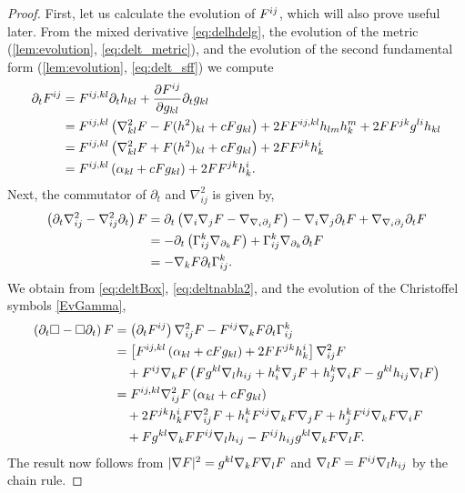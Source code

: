 \documentclass{amsart}
\begin{document}
\begin{proof}
First, let us calculate the evolution of \(F^{ij}\), which will also prove useful later. From the mixed derivative \cref{eq:delhdelg}, the evolution of the metric (\cref{lem:evolution}, \cref{eq:delt_metric}), and the evolution of the second fundamental form (\cref{lem:evolution}, \cref{eq:delt_sff}) we compute
\begin{equation}
\label{eq:deltBox}
\begin{split}
\partial_{t} F^{ij} &= F^{ij,kl} \partial_t h_{kl} + \frac{\partial F^{ij}}{\partial g_{kl}} \partial_t g_{kl} \\
&= F^{ij,kl} \left(\nabla^2_{kl} F - F(h^2)_{kl} + c F g_{kl}\right) + 2F F^{ij,kl} h_{lm}h^{m}_{k} + 2FF^{jk}g^{li}h_{kl} \\
&= F^{ij,kl} \left(\nabla^2_{kl} F + F(h^2)_{kl} + c F g_{kl}\right) + 2FF^{jk}h^{i}_{k} \\
&= F^{ij,kl} \left(\alpha_{kl} + c F g_{kl}\right) + 2FF^{jk}h^{i}_{k}.
\end{split}
\end{equation}
Next, the commutator of \(\partial_t\) and \(\nabla^2_{ij}\) is given by,
\begin{equation}
\label{eq:deltnabla2}
\begin{split}
\left(\partial_{t}\nabla^2_{ij} - \nabla^2_{ij}\partial_{t}\right) F &= \partial_t \left(\nabla_i \nabla_j F - \nabla_{\nabla_i \partial_j} F\right) - \nabla_i \nabla_j \partial_t F + \nabla_{\nabla_i \partial_j} \partial_t F \\
&= - \partial_t \left(\Gamma_{ij}^k \nabla_{\partial_k} F\right) + \Gamma_{ij}^k \nabla_{\partial_k} \partial_t F \\
&= - \nabla_k F \partial_t \Gamma_{ij}^k.
\end{split}
\end{equation}
We obtain from \cref{eq:deltBox}, \cref{eq:deltnabla2}, and the evolution of the Christoffel symbols \cref{EvGamma},
\[
\begin{split}
\left(\partial_{t}\Box - \Box\partial_{t}\right) F &= \left(\partial_{t}F^{ij}\right) \nabla^2_{ij} F - F^{ij}\nabla_k F\partial_t \Gamma^{k}_{ij} \\
&= \left[F^{ij,kl} \left(\alpha_{kl} + c F g_{kl}\right) + 2FF^{jk}h^{i}_{k}\right] \nabla^2_{ij} F \\
&\quad + F^{ij} \nabla_k F \left(F g^{kl} \nabla_l h_{ij} + h^k_i \nabla_j F + h^k_j \nabla_i F - g^{kl} h_{ij} \nabla_l F\right) \\
&= F^{ij,kl} \nabla^2_{ij} F \left(\alpha_{kl} + c F g_{kl}\right) \\
&\quad + 2F^{jk}h^{i}_{k}F \nabla^2_{ij} F + h^k_i F^{ij} \nabla_k F \nabla_j F + h^k_j F^{ij} \nabla_k F \nabla_i F \\
&\quad + F g^{kl}\nabla_k F F^{ij} \nabla_l h_{ij} - F^{ij} h_{ij} g^{kl}\nabla_k F \nabla_l F.
\end{split}
\]
The result now follows from \(|\nabla F|^2 = g^{kl}\nabla_k F \nabla_l F\) and \(\nabla_l F = F^{ij} \nabla_l h_{ij}\) by the chain rule.
\end{proof}
\end{document}
